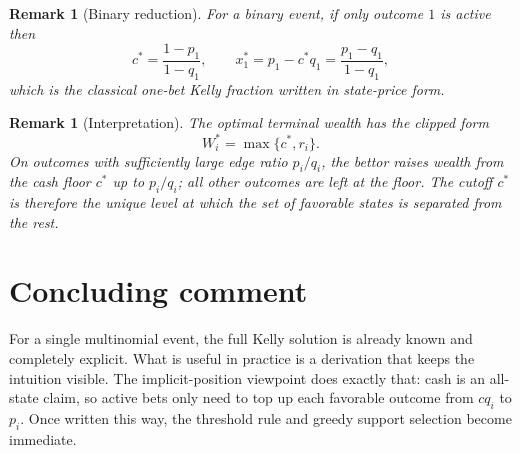 \documentclass[11pt]{article}
\newtheorem{remark}[theorem]{Remark}
\begin{document}
\begin{remark}[Binary reduction]
For a binary event, if only outcome $1$ is active then
\[
  c^*=\frac{1-p_1}{1-q_1},
  \qquad
  x_1^*=p_1-c^*q_1=\frac{p_1-q_1}{1-q_1},
\]
which is the classical one-bet Kelly fraction written in state-price form.
\end{remark}

\begin{remark}[Interpretation]
The optimal terminal wealth has the clipped form
\[
  W_i^*=\max\{c^*,r_i\}.
\]
On outcomes with sufficiently large edge ratio $p_i/q_i$, the bettor raises wealth from the cash floor $c^*$ up to $p_i/q_i$; all other outcomes are left at the floor. The cutoff $c^*$ is therefore the unique level at which the set of favorable states is separated from the rest.
\end{remark}

\section{Concluding comment}
For a single multinomial event, the full Kelly solution is already known and completely explicit. What is useful in practice is a derivation that keeps the intuition visible. The implicit-position viewpoint does exactly that: cash is an all-state claim, so active bets only need to top up each favorable outcome from $cq_i$ to $p_i$. Once written this way, the threshold rule and greedy support selection become immediate.
\end{document}
